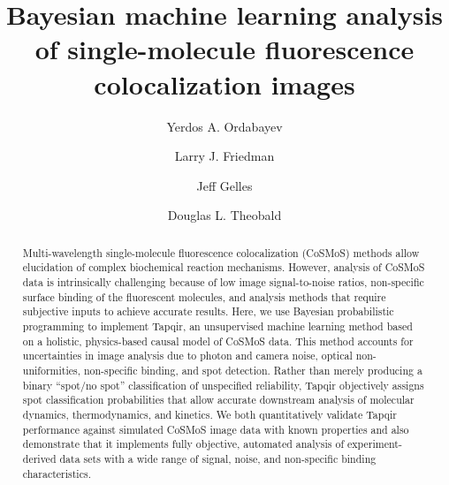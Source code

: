 \documentclass[9pt,lineno]{elife}
\title{Bayesian machine learning analysis of single-molecule fluorescence colocalization images}
\author[1]{Yerdos A. Ordabayev}
\author[1]{Larry  J. Friedman}
\author[1*]{Jeff Gelles}
\author[1*]{Douglas L. Theobald}
\affil[1]{Department of Biochemistry, Brandeis University, Waltham, MA 02454 USA}
\begin{document}
\maketitle

\begin{abstract} %
Multi-wavelength single-molecule fluorescence colocalization (CoSMoS) methods allow elucidation of complex biochemical reaction mechanisms. However, analysis of CoSMoS data is intrinsically challenging because of low image signal-to-noise ratios, non-specific surface binding of the fluorescent molecules, and analysis methods that require subjective inputs to achieve accurate results. Here, we use Bayesian probabilistic programming to implement Tapqir, an unsupervised machine learning method based on a holistic, physics-based causal model of CoSMoS data.  This method accounts for uncertainties in image analysis due to photon and camera noise, optical non-uniformities, non-specific binding, and spot detection. Rather than merely producing a binary ``spot/no spot'' classification of unspecified reliability, Tapqir objectively assigns spot classification probabilities that allow accurate downstream analysis of molecular dynamics, thermodynamics, and kinetics.   We both quantitatively validate Tapqir performance against simulated CoSMoS image data with known properties and also demonstrate that it implements fully objective, automated analysis of experiment-derived data sets with a wide range of signal, noise, and non-specific binding characteristics. 
\end{abstract}











% 


% 

% 


\end{document}
